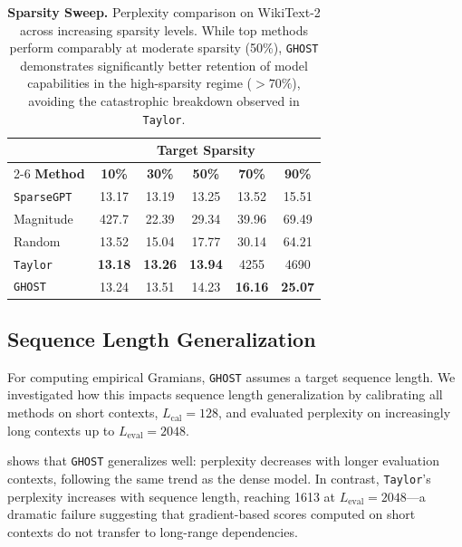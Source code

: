 \documentclass{article}
\theoremstyle{plain}
\theoremstyle{definition}
\theoremstyle{remark}
\begin{document}
\begin{table}[!t]
\centering
\caption{\textbf{Sparsity Sweep.} Perplexity comparison on WikiText-2 across increasing sparsity levels. While top methods perform comparably at moderate sparsity (50\%), \texttt{GHOST} demonstrates significantly better retention of model capabilities in the high-sparsity regime ($>70\%$), avoiding the catastrophic breakdown observed in \texttt{Taylor}.}
\label{tab:sparsity_sweep}
\begin{tabular}{lccccc}
\toprule
& \multicolumn{5}{c}{\textbf{Target Sparsity}} \\
\cmidrule(lr){2-6}
\textbf{Method} & \textbf{10\%} & \textbf{30\%} & \textbf{50\%} & \textbf{70\%} & \textbf{90\%} \\
\midrule
\texttt{SparseGPT} & 13.17 & 13.19 & 13.25 & 13.52 & 15.51 \\
\midrule
Magnitude & 427.7 & 22.39 & 29.34 & 39.96 & 69.49 \\
Random & 13.52 & 15.04 & 17.77 & 30.14 & 64.21 \\
\texttt{Taylor} & \textbf{13.18} & \textbf{13.26} & \textbf{13.94} & 4255 & 4690 \\
\texttt{GHOST} & 13.24 & 13.51 & 14.23 & \textbf{16.16} & \textbf{25.07} \\
\bottomrule
\end{tabular}
\end{table}


\subsection{Sequence Length Generalization}
\label{subsec:length_gen}

For computing empirical Gramians, \texttt{GHOST} assumes a target sequence length. We investigated how this impacts sequence length generalization by calibrating all methods on short contexts, $L_{\text{cal}} = 128$, and evaluated perplexity on increasingly long contexts up to $L_{\text{eval}}=2048$. 

 shows that \texttt{GHOST} generalizes well: perplexity decreases with longer evaluation contexts, following the same trend as the dense model. In contrast, \texttt{Taylor}'s perplexity increases with sequence length, reaching 1613 at $L_{\text{eval}} = 2048$---a dramatic failure suggesting that gradient-based scores computed on short contexts do not transfer to long-range dependencies.
\end{document}
